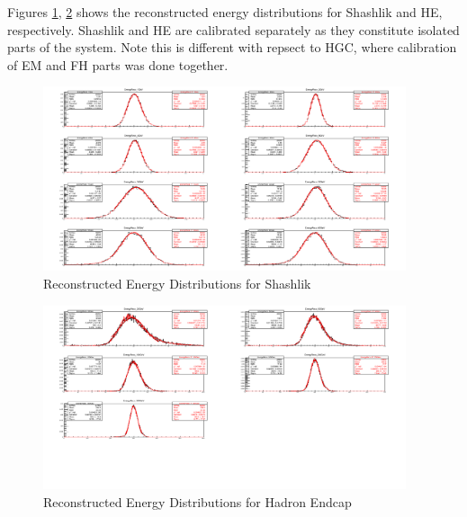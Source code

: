 Figures \ref{fig:simulations_shashlik_energyreco}, \ref{fig:simulations_he_energyreco} shows the reconstructed energy distributions for Shashlik and HE, respectively. Shashlik and HE are calibrated separately as they constitute isolated parts of the system. Note this is different with repsect to HGC, where calibration of EM and FH parts was done together.
\begin{figure}[hbtp]
    \centering
    \includegraphics[width=0.95\textwidth]{figures/ch_simulations/shashlik/performance/EnergyRecoDistributions.png}
    \caption{Reconstructed Energy Distributions for Shashlik}
    \label{fig:simulations_shashlik_energyreco}
 \end{figure}
 \begin{figure}[hbtp]
    \centering
    \includegraphics[width=0.95\textwidth]{figures/ch_simulations/he/performance/EnergyRECODistributions.png}
    \caption{Reconstructed Energy Distributions for Hadron Endcap}
    \label{fig:simulations_he_energyreco}
 \end{figure}

